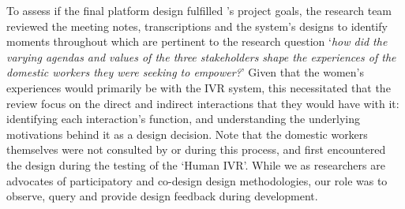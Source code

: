 To assess if the final platform design fulfilled \NGO{}'s project goals, the research team reviewed the meeting notes, transcriptions and the system's designs to identify moments throughout which are pertinent to the research question `\textit{how did the varying agendas and values of the three stakeholders shape the experiences of the domestic workers they were seeking to empower?}' Given that the women's experiences would primarily be with the IVR system, this necessitated that the review focus on the direct and indirect interactions that they would have with it: identifying each interaction's function, and understanding the underlying motivations behind it as a design decision. Note that the domestic workers themselves were not consulted by \PC{} or \NGO{} during this process, and first encountered the design during the testing of the `Human IVR'. While we as researchers are advocates of participatory and co-design design methodologies, our role was to observe, query and provide design feedback during development.